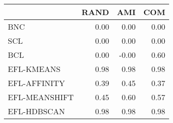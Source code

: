 \begin{tabular}{lrrr}
\toprule
 & RAND & AMI & COM \\
\midrule
BNC & 0.00 & 0.00 & 0.00 \\
SCL & 0.00 & 0.00 & 0.00 \\
BCL & 0.00 & -0.00 & 0.60 \\
EFL-KMEANS & 0.98 & 0.98 & 0.98 \\
EFL-AFFINITY & 0.39 & 0.45 & 0.37 \\
EFL-MEANSHIFT & 0.45 & 0.60 & 0.57 \\
EFL-HDBSCAN & 0.98 & 0.98 & 0.98 \\
\bottomrule
\end{tabular}

